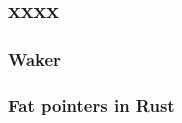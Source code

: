 \subsection{xxxx} %
\begin{frame}[fragile]
    \frametitle{Waker}
\end{frame}
% 
% 
% 
% 
% 
\begin{frame}[fragile]
    \frametitle{Fat pointers in Rust}
\end{frame}
% 
% 
% 
% 
% 
